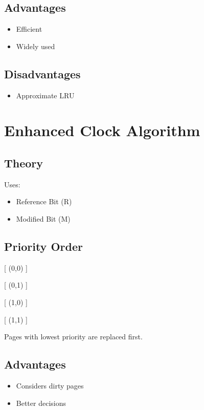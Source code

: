 \subsection{Advantages}

\begin{itemize}
\item Efficient
\item Widely used
\end{itemize}

\subsection{Disadvantages}

\begin{itemize}
\item Approximate LRU
\end{itemize}

\section{Enhanced Clock Algorithm}

\subsection{Theory}

Uses:

\begin{itemize}
\item Reference Bit (R)
\item Modified Bit (M)
\end{itemize}

\subsection{Priority Order}

[
(0,0)
]

[
(0,1)
]

[
(1,0)
]

[
(1,1)
]

Pages with lowest priority are replaced first.

\subsection{Advantages}

\begin{itemize}
\item Considers dirty pages
\item Better decisions
\end{itemize}

